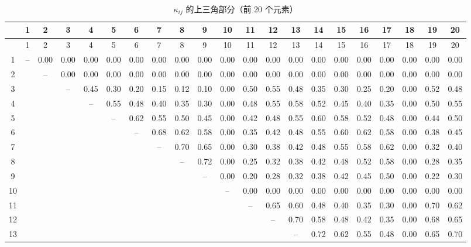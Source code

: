\documentclass[12pt,a4paper]{article}
\begin{document}
	{\tiny
		\begin{longtable}{c|*{20}{c}}
			\caption{\(\kappa_{ij}\) 的上三角部分（前 20 个元素）} \label{tab:kappa-full-20} \\
			\toprule
			& 1 & 2 & 3 & 4 & 5 & 6 & 7 & 8 & 9 & 10 & 11 & 12 & 13 & 14 & 15 & 16 & 17 & 18 & 19 & 20 \\
			\midrule
			\endfirsthead
			\toprule
			& 1 & 2 & 3 & 4 & 5 & 6 & 7 & 8 & 9 & 10 & 11 & 12 & 13 & 14 & 15 & 16 & 17 & 18 & 19 & 20 \\
			\midrule
			\endhead
			1  & – & 0.00 & 0.00 & 0.00 & 0.00 & 0.00 & 0.00 & 0.00 & 0.00 & 0.00 & 0.00 & 0.00 & 0.00 & 0.00 & 0.00 & 0.00 & 0.00 & 0.00 & 0.00 & 0.00 \\
			2  &   & – & 0.00 & 0.00 & 0.00 & 0.00 & 0.00 & 0.00 & 0.00 & 0.00 & 0.00 & 0.00 & 0.00 & 0.00 & 0.00 & 0.00 & 0.00 & 0.00 & 0.00 & 0.00 \\
			3  &   &   & – & 0.45 & 0.30 & 0.20 & 0.15 & 0.12 & 0.10 & 0.00 & 0.50 & 0.55 & 0.48 & 0.35 & 0.30 & 0.25 & 0.20 & 0.00 & 0.52 & 0.48 \\
			4  &   &   &   & – & 0.55 & 0.48 & 0.40 & 0.35 & 0.30 & 0.00 & 0.48 & 0.55 & 0.58 & 0.52 & 0.45 & 0.40 & 0.35 & 0.00 & 0.50 & 0.55 \\
			5  &   &   &   &   & – & 0.62 & 0.55 & 0.50 & 0.45 & 0.00 & 0.42 & 0.48 & 0.55 & 0.60 & 0.58 & 0.52 & 0.48 & 0.00 & 0.44 & 0.50 \\
			6  &   &   &   &   &   & – & 0.68 & 0.62 & 0.58 & 0.00 & 0.35 & 0.42 & 0.48 & 0.55 & 0.60 & 0.62 & 0.58 & 0.00 & 0.38 & 0.45 \\
			7  &   &   &   &   &   &   & – & 0.70 & 0.65 & 0.00 & 0.30 & 0.38 & 0.42 & 0.48 & 0.55 & 0.58 & 0.62 & 0.00 & 0.32 & 0.40 \\
			8  &   &   &   &   &   &   &   & – & 0.72 & 0.00 & 0.25 & 0.32 & 0.38 & 0.42 & 0.48 & 0.52 & 0.58 & 0.00 & 0.28 & 0.35 \\
			9  &   &   &   &   &   &   &   &   & – & 0.00 & 0.20 & 0.28 & 0.32 & 0.38 & 0.42 & 0.45 & 0.50 & 0.00 & 0.22 & 0.30 \\
			10 &   &   &   &   &   &   &   &   &   & – & 0.00 & 0.00 & 0.00 & 0.00 & 0.00 & 0.00 & 0.00 & 0.00 & 0.00 & 0.00 \\
			11 &   &   &   &   &   &   &   &   &   &   & – & 0.65 & 0.60 & 0.48 & 0.40 & 0.35 & 0.30 & 0.00 & 0.70 & 0.62 \\
			12 &   &   &   &   &   &   &   &   &   &   &   & – & 0.70 & 0.58 & 0.48 & 0.42 & 0.35 & 0.00 & 0.68 & 0.65 \\
			13 &   &   &   &   &   &   &   &   &   &   &   &   & – & 0.72 & 0.62 & 0.55 & 0.48 & 0.00 & 0.65 & 0.70 \\

\end{longtable}}
\end{document}
